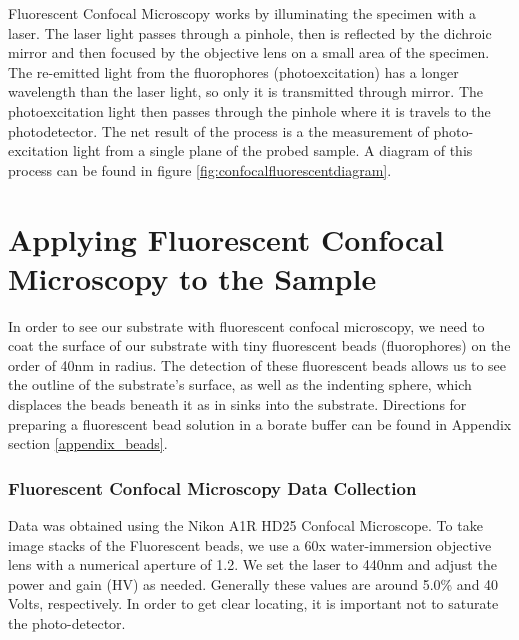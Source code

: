 Fluorescent Confocal Microscopy works by illuminating the specimen with a laser. The laser light passes through a pinhole, then is reflected by the dichroic mirror and then focused by the objective lens on a small area of the specimen. The re-emitted light from the fluorophores (photoexcitation) has a longer wavelength than the laser light, so only it is transmitted through mirror. The photoexcitation light then passes through the pinhole where it is travels to the photodetector. The net result of the process is a the measurement of photo-excitation light from a single plane of the probed sample. A diagram of this process can be found in figure \ref{fig:confocalfluorescentdiagram}.

\section{Applying Fluorescent Confocal Microscopy to the Sample}
In order to see our substrate with fluorescent confocal microscopy, we need to coat the surface of our substrate with tiny fluorescent beads (fluorophores) on the order of 40nm in radius. The detection of these fluorescent beads allows us to see the outline of the substrate's surface, as well as the indenting sphere, which displaces the beads beneath it as in sinks into the substrate. Directions for preparing a fluorescent bead solution in a borate buffer can be found in Appendix section \ref{appendix_beads}. 

\subsubsection{Fluorescent Confocal Microscopy Data Collection}
Data was obtained using the Nikon A1R HD25 Confocal Microscope. To take image stacks of the Fluorescent beads, we use a 60x water-immersion objective lens with a numerical aperture of 1.2. We set the laser to 440nm and adjust the power and gain (HV) as needed. Generally these values are around 5.0\% and 40 Volts, respectively. In order to get clear locating, it is important not to saturate the photo-detector. 

